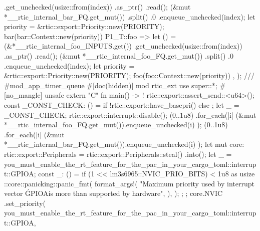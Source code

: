 {{{{{{                                .get_unchecked(usize::from(index))
                                .as_ptr()
                                .read();
                            (&mut *__rtic_internal_bar_FQ.get_mut())
                                .split()
                                .0
                                .enqueue_unchecked(index);
                            let priority = &rtic::export::Priority::new(PRIORITY);
                            bar(bar::Context::new(priority))
                        }
                        P1_T::foo => {
                            let () = (&*__rtic_internal_foo_INPUTS.get())
                                .get_unchecked(usize::from(index))
                                .as_ptr()
                                .read();
                            (&mut *__rtic_internal_foo_FQ.get_mut())
                                .split()
                                .0
                                .enqueue_unchecked(index);
                            let priority = &rtic::export::Priority::new(PRIORITY);
                            foo(foo::Context::new(priority))
                        }
                    }
                }
            },
        );
    }
    /// #mod_app_timer_queue
    #[doc(hidden)]
    mod rtic_ext {
        use super::*;
        #[no_mangle]
        unsafe extern "C" fn main() -> ! {
            rtic::export::assert_send::<u64>();
            const _CONST_CHECK: () = { if !rtic::export::have_basepri() {} else {} };
            let _ = _CONST_CHECK;
            rtic::export::interrupt::disable();
            (0..1u8)
                .for_each(|i| {
                    (&mut *__rtic_internal_foo_FQ.get_mut()).enqueue_unchecked(i)
                });
            (0..1u8)
                .for_each(|i| {
                    (&mut *__rtic_internal_bar_FQ.get_mut()).enqueue_unchecked(i)
                });
            let mut core: rtic::export::Peripherals = rtic::export::Peripherals::steal()
                .into();
            let _ = you_must_enable_the_rt_feature_for_the_pac_in_your_cargo_toml::interrupt::GPIOA;
            const _: () = if (1 << lm3s6965::NVIC_PRIO_BITS) < 1u8 as usize {
                {
                    ::core::panicking::panic_fmt(
                        format_args!(
                            "Maximum priority used by interrupt vector \'GPIOA\' is more than supported by hardware",
                        ),
                    );
                };
            };
            core.NVIC
                .set_priority(
                    you_must_enable_the_rt_feature_for_the_pac_in_your_cargo_toml::interrupt::GPIOA,
}}}
